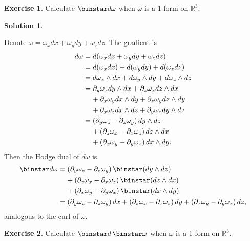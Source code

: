 \documentclass[11pt, a4paper]{report}
\theoremstyle{definition}
\newtheorem{exercise}{Exercise}[part]
\newtheorem{solution}{Solution}[part]
\newenvironment{ex}{\begin{exercise}}{\end{exercise}\pagebreak[1]}
\newenvironment{sol}{\begin{solution}}{\end{solution}\pagebreak[3]}
\newcommand*{\pheq}{\ensuremath\mathrel{\phantom{=}}\negmedspace{}}
\renewcommand*{\d}{\ensuremath\mathop{}\mathopen{}d}
\renewcommand*{\star}{\ensuremath\mathop{}\mathopen\binstar\mathord{}}
\begin{document}
\begin{ex}

Calculate $\star d\omega$ when $\omega$ is a 1-form on $\mathbb{R}^3$.

\end{ex}

\begin{sol}\label{sol:curl1form}

Denote $\omega = \omega_x dx + \omega_y dy + \omega_z dz$. The gradient is
\begin{align*}
    d\omega &= d(\omega_x dx + \omega_y dy + \omega_z dz) \\
        &= d(\omega_x dx) + d(\omega_y dy) + d(\omega_z dz) \\
        &= d\omega_x \wedge dx + d\omega_y \wedge dy + d\omega_z \wedge dz \\
        &= \partial_y \omega_x dy \wedge dx + \partial_z \omega_x dz \wedge dx \\
        &\pheq + \partial_x \omega_y dx \wedge dy + \partial_z \omega_y dz \wedge dy \\
        &\pheq + \partial_x \omega_z dx \wedge dz + \partial_y \omega_z dy \wedge dz \\
        &= (\partial_y \omega_z - \partial_z \omega_y) \d y \wedge dz \\
        &\pheq + (\partial_z \omega_x - \partial_x \omega_z) \d z \wedge dx \\
        &\pheq +(\partial_x \omega_y - \partial_y \omega_x) \d x \wedge dy.
\end{align*}
Then the Hodge dual of $d\omega$ is
\begin{align*}
    \star d\omega &= (\partial_y \omega_z - \partial_z \omega_y) \star (dy \wedge dz) \\
        &\pheq + (\partial_z \omega_x - \partial_x \omega_z) \star (dz \wedge dx) \\
        &\pheq + (\partial_x \omega_y - \partial_y \omega_x) \star (dx \wedge dy) \\
        &= \left(\partial_y \omega_z - \partial_z \omega_y\right) \d x
            + \left(\partial_z \omega_x - \partial_x \omega_z\right) \d y
            + \left(\partial_x \omega_y - \partial_y \omega_x\right) \d z,
\end{align*}
analogous to the curl of $\omega$.

\end{sol}

\begin{ex}

Calculate $\star d \star \omega$ when $\omega$ is a 1-form on $\mathbb{R}^3$.

\end{ex}
\end{document}
